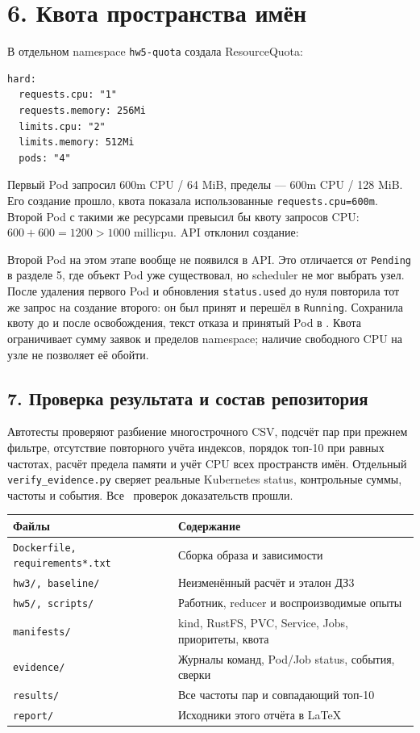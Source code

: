 \documentclass[10pt,a4paper]{article}
\begin{document}
\section*{6. Квота пространства имён}
В отдельном namespace \texttt{hw5-quota} создала ResourceQuota:
\begin{Verbatim}[fontsize=\small]
hard:
  requests.cpu: "1"
  requests.memory: 256Mi
  limits.cpu: "2"
  limits.memory: 512Mi
  pods: "4"
\end{Verbatim}
Первый Pod запросил 600m CPU / 64 MiB, пределы --- 600m CPU / 128 MiB.
Его создание прошло, квота показала использованные \texttt{requests.cpu=600m}.
Второй Pod с такими же ресурсами превысил бы квоту запросов CPU:
$600+600=1200>1000$ millicpu. API отклонил создание:

Второй Pod на этом этапе вообще не появился в API. Это отличается от
\texttt{Pending} в разделе 5, где объект Pod уже существовал, но scheduler
не мог выбрать узел. После удаления первого Pod и обновления
\texttt{status.used} до нуля повторила тот же запрос на создание второго:
он был принят и перешёл в \texttt{Running}. Сохранила квоту до и после
освобождения, текст отказа и принятый Pod в .
Квота ограничивает сумму заявок и пределов namespace; наличие свободного
CPU на узле не позволяет её обойти.

\subsection*{7. Проверка результата и состав репозитория}
Автотесты проверяют разбиение многострочного CSV, подсчёт пар при прежнем
фильтре, отсутствие повторного учёта индексов, порядок топ-10 при равных
частотах, расчёт предела памяти и учёт CPU всех пространств имён.
Отдельный \texttt{verify\_evidence.py} сверяет реальные Kubernetes status,
контрольные суммы, частоты и события. Все \VerificationCount\ проверок
доказательств прошли.

\begin{center}
\begin{tabularx}{\linewidth}{lX}
\toprule
Файлы & Содержание \\
\midrule
\texttt{Dockerfile, requirements*.txt} & Сборка образа и зависимости \\
\texttt{hw3/, baseline/} & Неизменённый расчёт и эталон ДЗ3 \\
\texttt{hw5/, scripts/} & Работник, reducer и воспроизводимые опыты \\
\texttt{manifests/} & kind, RustFS, PVC, Service, Jobs, приоритеты, квота \\
\texttt{evidence/} & Журналы команд, Pod/Job status, события, сверки \\
\texttt{results/} & Все частоты пар и совпадающий топ-10 \\
\texttt{report/} & Исходники этого отчёта в LaTeX \\
\bottomrule
\end{tabularx}
\end{center}
\end{document}
